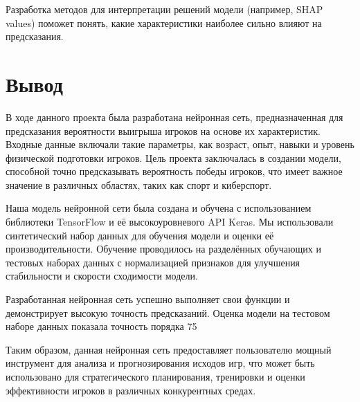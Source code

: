 \documentclass[12pt,a4paper]{article}
\begin{document}
Разработка методов для интерпретации решений модели (например, SHAP values) поможет понять, какие характеристики наиболее сильно влияют на предсказания. 

\section{Вывод}
В ходе данного проекта была разработана нейронная сеть, предназначенная для предсказания вероятности выигрыша игроков на основе их характеристик. Входные данные включали такие параметры, как возраст, опыт, навыки и уровень физической подготовки игроков. Цель проекта заключалась в создании модели, способной точно предсказывать вероятность победы игроков, что имеет важное значение в различных областях, таких как спорт и киберспорт. 

Наша модель нейронной сети была создана и обучена с использованием библиотеки TensorFlow и её высокоуровневого API Keras. Мы использовали синтетический набор данных для обучения модели и оценки её производительности. Обучение проводилось на разделённых обучающих и тестовых наборах данных с нормализацией признаков для улучшения стабильности и скорости сходимости модели. 

Разработанная нейронная сеть успешно выполняет свои функции и демонстрирует высокую точность предсказаний. Оценка модели на тестовом наборе данных показала точность порядка 75%

Таким образом, данная нейронная сеть предоставляет пользователю мощный инструмент для анализа и прогнозирования исходов игр, что может быть использовано для стратегического планирования, тренировки и оценки эффективности игроков в различных конкурентных средах. 
\end{document}
